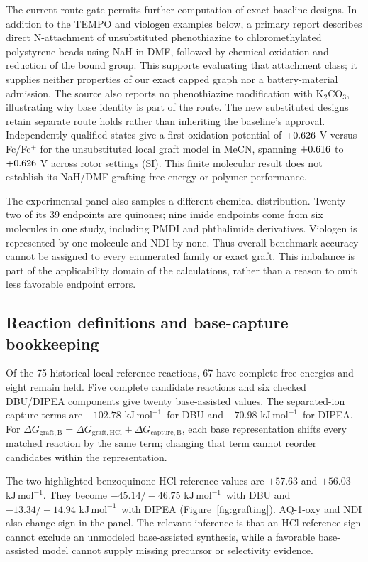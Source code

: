 \documentclass[11pt]{article}
\newcommand{\kj}{\ensuremath{\mathrm{kJ\,mol^{-1}}}}
\begin{document}
The current route gate permits further computation of \ReviewedRouteCount{} exact baseline designs. In addition to the TEMPO and viologen examples below, a primary report describes direct N-attachment of unsubstituted phenothiazine to chloromethylated polystyrene beads using NaH in DMF, followed by chemical oxidation and reduction of the bound group.\cite{wright1989supported} This supports evaluating that attachment class; it supplies neither properties of our exact capped graph nor a battery-material admission. The source also reports no phenothiazine modification with K$_2$CO$_3$, illustrating why base identity is part of the route. The new substituted designs retain separate route holds rather than inheriting the baseline's approval. Independently qualified states give a first oxidation potential of $+0.626$ V versus Fc/Fc$^+$ for the unsubstituted local graft model in MeCN, spanning $+0.616$ to $+0.626$ V across rotor settings (SI). This finite molecular result does not establish its NaH/DMF grafting free energy or polymer performance.

The experimental panel also samples a different chemical distribution. Twenty-two of its 39 endpoints are quinones; nine imide endpoints come from six molecules in one study, including PMDI and phthalimide derivatives. Viologen is represented by one molecule and NDI by none. Thus overall benchmark accuracy cannot be assigned to every enumerated family or exact graft. This imbalance is part of the applicability domain of the calculations, rather than a reason to omit less favorable endpoint errors.


\subsection{Reaction definitions and base-capture bookkeeping}
Of the 75 historical local reference reactions, 67 have complete free energies and eight remain held. Five complete candidate reactions and six checked DBU/DIPEA components give twenty base-assisted values. The separated-ion capture terms are $-102.78$ \kj\ for DBU and $-70.98$ \kj\ for DIPEA. For $\Delta G_{\mathrm{graft,B}}=\Delta G_{\mathrm{graft,HCl}}+\Delta G_{\mathrm{capture,B}}$, each base representation shifts every matched reaction by the same term; changing that term cannot reorder candidates within the representation.

The two highlighted benzoquinone HCl-reference values are $+57.63$ and $+56.03$ \kj. They become $-45.14/-46.75$ \kj\ with DBU and $-13.34/-14.94$ \kj\ with DIPEA (Figure~\ref{fig:grafting}). AQ-1-oxy and NDI also change sign in the panel. The relevant inference is that an HCl-reference sign cannot exclude an unmodeled base-assisted synthesis, while a favorable base-assisted model cannot supply missing precursor or selectivity evidence.
\end{document}
